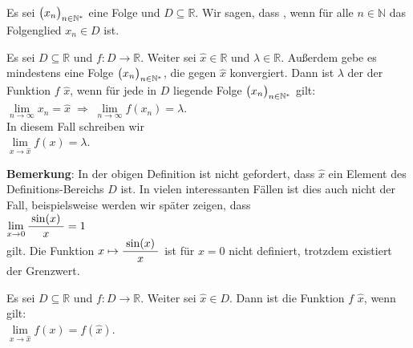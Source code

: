 \begin{Definition}
Es sei $\bigl(x_n\bigr)_{n\in\mathbb{N}^*}$ eine Folge und $D\subseteq \mathbb{R}$.  Wir sagen, dass 
, wenn f\"ur alle $n \in \mathbb{N}$ das Folgenglied $x_n
\in D$ ist.   
\end{Definition}

\begin{Definition}
  Es sei $D\subseteq \mathbb{R}$ und $f:D \rightarrow \mathbb{R}$.
  Weiter sei $\widehat{x} \in \mathbb{R}$ und  $\lambda\in \mathbb{R}$.  Au{\ss}erdem gebe es
  mindestens eine Folge $\bigl(x_n\bigr)_{n\in\mathbb{N}^*}$, die gegen $\widehat{x}$ konvergiert.
  Dann ist $\lambda$ der  der Funktion $f$  $\widehat{x}$,
  wenn f\"ur jede in $D$ liegende Folge $\bigl(x_n\bigr)_{n\in\mathbb{N}^*}$ gilt:
      \\[0.2cm]
      \hspace*{1.3cm}      
      $\lim\limits_{n\rightarrow\infty} x_n = \widehat{x} \;\Rightarrow\; \lim\limits_{n\rightarrow\infty} f(x_n) = \lambda$.
      \\[0.2cm]
      In diesem Fall schreiben wir 
      \\[0.2cm]
      \hspace*{1.3cm}      
      $\lim\limits_{x \rightarrow \widehat{x}} f(x) = \lambda$. 
      \eod
\end{Definition}

\noindent
\textbf{Bemerkung}:  In der obigen Definition ist nicht gefordert,
dass $\widehat{x}$ ein Element des Definitions-Bereichs  $D$ ist.  In vielen interessanten F\"allen
ist dies auch nicht der Fall, beispielsweise werden wir sp\"ater zeigen, dass 
\\[0.2cm]
\hspace*{1.3cm}      
$\lim\limits_{x \rightarrow 0} \displaystyle\frac{\;\displaystyle\sin(x)\;}{\;\displaystyle x\;} = 1$
\\[0.2cm]
gilt. Die Funktion $x \mapsto \displaystyle\frac{\;\displaystyle\sin(x)\;}{\;\displaystyle x\;}$ ist f\"ur $x=0$ nicht definiert, trotzdem
existiert der Grenzwert.
\eox


\begin{Definition}[Stetigkeit]
  Es sei $D\subseteq \mathbb{R}$ und $f:D \rightarrow \mathbb{R}$.
  Weiter sei $\widehat{x}\in D$. Dann ist die Funktion $f$  $\widehat{x}$,
  wenn gilt: \\[0.2cm]
  \hspace*{1.3cm}      
  $\lim\limits_{x\rightarrow \widehat{x}} f(x) = f(\widehat{x})$.  \eod
\end{Definition}

